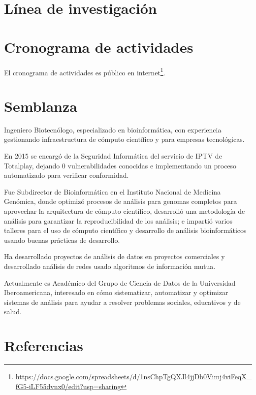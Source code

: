 \documentclass[
  12,
]{scrartcl}
\DeclareRobustCommand{\href}[2]{#2\footnote{\url{#1}}}
\begin{document}
\hypertarget{luxednea-de-investigaciuxf3n}{%
\section{Línea de investigación}\label{luxednea-de-investigaciuxf3n}}

\hypertarget{cronograma-de-actividades}{%
\section{Cronograma de actividades}\label{cronograma-de-actividades}}

El cronograma de actividades
\href{https://docs.google.com/spreadsheets/d/1nsChpTgQXJl4jjDb0Vimj4viFeqX_fG5-iLF55dvnx0/edit?usp=sharing}{es
público en internet}.

\newpage

\hypertarget{semblanza}{%
\section{Semblanza}\label{semblanza}}

Ingeniero Biotecnólogo, especializado en bioinformática, con experiencia
gestionando infraestructura de cómputo científico y para empresas
tecnológicas.

En 2015 se encargó de la Seguridad Informática del servicio de IPTV de
Totalplay, dejando 0 vulnerabilidades conocidas e implementando un
proceso automatizado para verificar conformidad.

Fue Subdirector de Bioinformática en el Instituto Nacional de Medicina
Genómica, donde optimizó procesos de análisis para genomas completos
para aprovechar la arquitectura de cómputo científico, desarrolló una
metodología de análisis para garantizar la reproducibilidad de los
análisis; e impartió varios talleres para el uso de cómputo científico y
desarrollo de análisis bioinformáticos usando buenas prácticas de
desarrollo.

Ha desarrollado proyectos de análisis de datos en proyectos comerciales
y desarrollado análisis de redes usado algoritmos de información mutua.

Actualmente es Académico del Grupo de Ciencia de Datos de la Universidad
Iberoamericana, interesado en cómo sistematizar, automatizar y optimizar
sistemas de análisis para ayudar a resolver problemas sociales,
educativos y de salud.

\newpage

\hypertarget{referencias}{%
\section*{Referencias}\label{referencias}}
\end{document}
